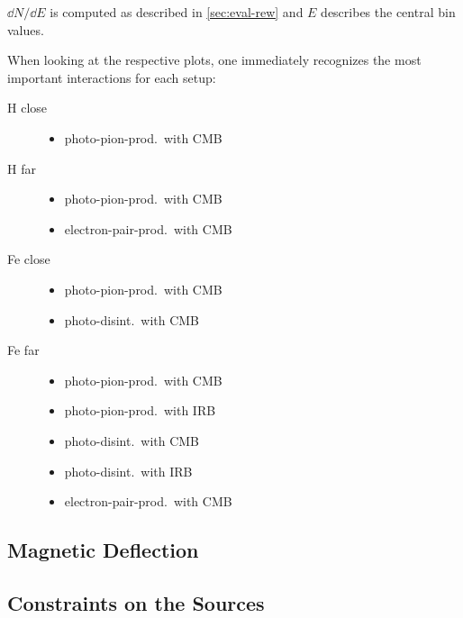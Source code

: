 $\dd{N}/\dd{E}$ is computed as described in \cref{sec:eval-rew} and $E$
describes the central bin values.

When looking at the respective plots, one immediately recognizes the most
important interactions for each setup:
\begin{description}
    \item[H close]
        \begin{itemize}
            \item photo-pion-prod.~with CMB
        \end{itemize}
    \item[H far]
        \begin{itemize}
            \item photo-pion-prod.~with CMB
            \item electron-pair-prod.~with CMB
        \end{itemize}
    \item[Fe close]
        \begin{itemize}
            \item photo-pion-prod.~with CMB
            \item photo-disint.~with CMB
        \end{itemize}
    \item[Fe far]
        \begin{itemize}
            \item photo-pion-prod.~with CMB
            \item photo-pion-prod.~with IRB
            \item photo-disint.~with CMB
            \item photo-disint.~with IRB
            \item electron-pair-prod.~with CMB
        \end{itemize}
\end{description}



\subsection{Magnetic Deflection}


\subsection{Constraints on the Sources}


